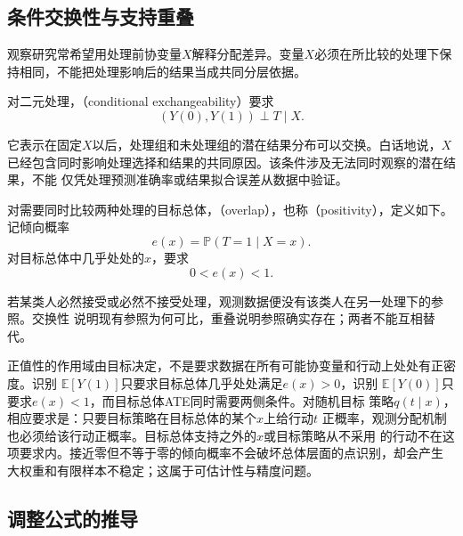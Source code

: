\subsection{条件交换性与支持重叠}

观察研究常希望用处理前协变量\(X\)解释分配差异。变量\(X\)必须在所比较的处理下保持相同，不能把处理影响后的结果当成共同分层依据。
\begin{definition}[条件交换性]
  \label{def:causal-conditional-exchangeability}
对二元处理，（conditional exchangeability）要求
\begin{equation}
  (Y(0),Y(1))\perp T\mid X.
  \label{eq:causal-conditional-exchangeability}
\end{equation}
\end{definition}
它表示在固定\(X\)以后，处理组和未处理组的潜在结果分布可以交换。白话地说，\(X\)
已经包含同时影响处理选择和结果的共同原因。该条件涉及无法同时观察的潜在结果，不能
仅凭处理预测准确率或结果拟合误差从数据中验证。

\begin{definition}[二元处理的支持重叠]
  \label{def:causal-overlap}
对需要同时比较两种处理的目标总体，（overlap），也称（positivity），定义如下。记倾向概率
\[
  e(x)=\mathbb{P}(T=1\mid X=x).
\]
对目标总体中几乎处处的\(x\)，要求
\begin{equation}
  0<e(x)<1.
  \label{eq:causal-overlap}
\end{equation}
\end{definition}
若某类人必然接受或必然不接受处理，观测数据便没有该类人在另一处理下的参照。交换性
说明现有参照为何可比，重叠说明参照确实存在；两者不能互相替代。

正值性的作用域由目标决定，不是要求数据在所有可能协变量和行动上处处有正密度。识别
\(\mathbb{E}[Y(1)]\)只要求目标总体几乎处处满足\(e(x)>0\)，识别
\(\mathbb{E}[Y(0)]\)只要求\(e(x)<1\)，而目标总体ATE同时需要两侧条件。对随机目标
策略\(q(t\mid x)\)，相应要求是：只要目标策略在目标总体的某个\(x\)上给行动\(t\)
正概率，观测分配机制也必须给该行动正概率。目标总体支持之外的\(x\)或目标策略从不采用
的行动不在这项要求内。接近零但不等于零的倾向概率不会破坏总体层面的点识别，却会产生
大权重和有限样本不稳定；这属于可估计性与精度问题。

\subsection{调整公式的推导}

